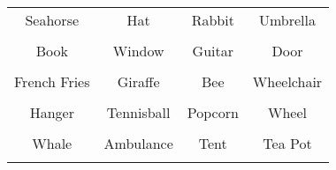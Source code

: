 \documentclass[12pt,a4paper]{article}
\begin{document}
\thispagestyle{empty}
\begin{table}[]
\centering
\Huge
\begin{tabular}{cccc}
 Seahorse& Hat& Rabbit& Umbrella\\  & & & \\
 Book& Window& Guitar& Door\\  & & & \\
 French Fries& Giraffe& Bee& Wheelchair\\  & & & \\
 Hanger& Tennisball& Popcorn& Wheel\\  & & & \\
 Whale& Ambulance& Tent& Tea Pot\\  & & & \\
\end{tabular}
\end{table}
\end{document}
